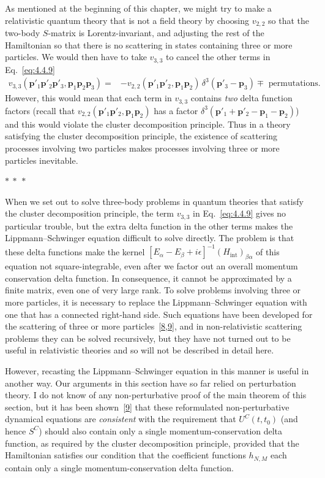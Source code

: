 As mentioned at the beginning of this chapter, we might try to make a
relativistic quantum theory that is not a field theory by choosing $v_{2,2}$ so
that the two-body $S$-matrix is Lorentz-invariant, and adjusting the rest of the
Hamiltonian so that there is no scattering in states containing three or more
particles. We would then have to take $v_{3,3}$ to cancel the other terms in
Eq.~\eqref{eq:4.4.9}
\begin{align}
v_{3,3}(\mathbf{p}'_1\mathbf{p}'_2\mathbf{p}'_3,
 \mathbf{p}_1\mathbf{p}_2\mathbf{p}_3)
={}&-v_{2,2}(\mathbf{p}'_1\mathbf{p}'_2,
 \mathbf{p}_1\mathbf{p}_2)\,
 \delta^3(\mathbf{p}'_3-\mathbf{p}_3)
 \mathbin{\mp}\text{ permutations}.
\tag{4.4.10}
\label{eq:4.4.10}
\end{align}
However, this would mean that each term in $v_{3,3}$ contains \emph{two} delta
function factors (recall that
$v_{2,2}(\mathbf{p}'_1\mathbf{p}'_2,\mathbf{p}_1\mathbf{p}_2)$ has a factor
$\delta^3(\mathbf{p}'_1+\mathbf{p}'_2-\mathbf{p}_1-\mathbf{p}_2)$) and this
would violate the cluster decomposition principle. Thus in a theory satisfying
the cluster decomposition principle, the existence of scattering processes
involving two particles makes processes involving three or more particles
inevitable.

\begin{center}
$*\ *\ *$
\end{center}

When we set out to solve three-body problems in quantum theories that satisfy
the cluster decomposition principle, the term $v_{3,3}$ in Eq.~\eqref{eq:4.4.9} gives no
particular trouble, but the extra delta function in the other terms makes the
Lippmann--Schwinger equation difficult to solve directly. The problem is that
these delta functions make the kernel
$[E_\alpha-E_\beta+i\epsilon]^{-1}(H_{\mathrm{int}})_{\beta\alpha}$ of this
equation not square-integrable, even after we factor out an overall momentum
conservation delta function. In consequence, it cannot be approximated by a
finite matrix, even one of very large rank. To solve problems involving three
or more particles, it is necessary to replace the Lippmann--Schwinger equation
with one that has a connected right-hand side. Such equations have been
developed for the scattering of three or more particles~\hyperref[ref:4.8]{[8,}\hyperref[ref:4.9]{9]}, and in
non-relativistic scattering problems they can be solved recursively, but they
have not turned out to be useful in relativistic theories and so will not be
described in detail here.

However, recasting the Lippmann--Schwinger equation in this manner is useful in
another way. Our arguments in this section have so far relied on perturbation
theory. I do not know of any non-perturbative proof of the main theorem of this
section, but it has been shown~\hyperref[ref:4.9]{[9]} that these reformulated non-perturbative
dynamical equations are \emph{consistent} with the requirement that
$U^C(t,t_0)$ (and hence $S^C$) should also contain only a single
momentum-conservation delta function, as required by the cluster decomposition
principle, provided that the Hamiltonian satisfies our condition that the
coefficient functions $h_{N,M}$ each contain only a single
momentum-conservation delta function.
